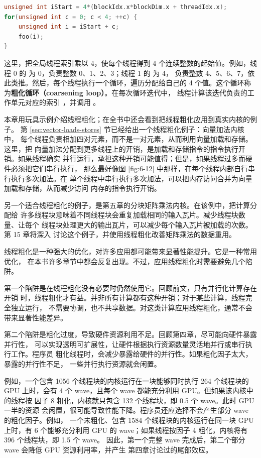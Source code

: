 \begin{lstlisting}[language=C++]
unsigned int iStart = 4*(blockIdx.x*blockDim.x + threadIdx.x);
for(unsigned int c = 0; c < 4; ++c) {
    unsigned int i = iStart + c;
    foo(i);
}
\end{lstlisting}

这里，把全局线程索引乘以 4，使每个线程得到 4 个连续整数的起始值。例如，线程 0
的  为 0，负责整数 0、1、2、3；线程 1 的  为 4，
负责整数 4、5、6、7，依此类推。然后，每个线程执行一个循环，遍历分配给自己的
4 个值。这个循环称为\textbf{粗化循环（coarsening loop）}。在每次循环迭代中，
线程计算该迭代负责的工作单元对应的索引 ，并调用 。

本章用玩具示例介绍线程粗化；在全书中还会看到把线程粗化应用到真实内核的例子。
第 \ref{sec:vector-loads-stores} 节已经给出一个线程粗化例子：向量加法内核中，
每个线程负责相加四对元素，而不是一对元素，从而利用向量加载和存储。这里，把
向量加法分配到更多线程上的开销，是加载和存储指令的指令执行开销。如果线程确实
并行运行，承担这种开销可能值得；但是，如果线程过多而硬件必须把它们串行执行，
那么最好像图 \ref{fig:6-12} 中那样，在每个线程内部自行串行执行多次加法。在
单个线程中串行执行多次加法，可以把内存访问合并为向量加载和存储，从而减少访问
内存的指令执行开销。

另一个适合线程粗化的例子，是第五章的分块矩阵乘法内核。在该例中，把计算分配给
许多线程块意味着不同线程块会重复加载相同的输入瓦片。减少线程块数量、让每个
线程块处理更大的输出瓦片，可以减少每个输入瓦片被加载的次数。第 15 章将深入
讨论这个例子，并使用线程粗化改善矩阵乘法的数据重用。

线程粗化是一种强大的优化，对许多应用都可能带来显著性能提升。它是一种常用优化，
在本书许多章节中都会反复出现。不过，应用线程粗化时需要避免几个陷阱。

第一个陷阱是在线程粗化没有必要时仍然使用它。回顾前文，只有并行化计算存在开销
时，线程粗化才有益。并非所有计算都有这种开销；对于某些计算，线程完全独立运行，
不需要协调，也不共享数据。对这类计算应用线程粗化，通常不会带来显著性能差异。

第二个陷阱是粗化过度，导致硬件资源利用不足。回顾第四章，尽可能向硬件暴露并行性，
可以实现透明可扩展性，让硬件根据执行资源数量灵活地并行或串行执行工作。程序员
粗化线程时，会减少暴露给硬件的并行性。如果粗化因子太大，暴露的并行性不足，
一些并行执行资源就会闲置。

例如，一个包含 1056 个线程块的内核运行在一块能够同时执行 264 个线程块的 GPU
上时，会有 4 个 wave，且每个 wave 都能充分利用 GPU。但如果该内核中的线程按
因子 8 粗化，内核就只包含 132 个线程块，即 0.5 个 wave。此时 GPU 一半的资源
会闲置，很可能导致性能下降。程序员还应选择不会产生部分 wave 的粗化因子。例如，
一个未粗化、包含 1584 个线程块的内核运行在同一块 GPU 上时，有 6 个能够充分利用
GPU 的 wave；如果线程按因子 4 粗化，内核将有 396 个线程块，即 1.5 个 wave。
因此，第一个完整 wave 完成后，第二个部分 wave 会降低 GPU 资源利用率，并产生
第四章讨论过的尾部效应。

